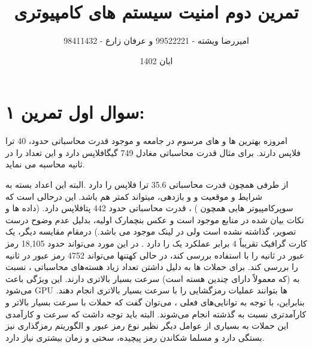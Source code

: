 \documentclass{article}
\title{تمرین دوم امنیت سیستم های کامپیوتری }
\author{
امیررضا ویشته - 99522221
 و عرفان زارع - 98411432  }
\date{ابان 1402}
\begin{document}
\maketitle

 \newpage
\section*{سوال اول تمرین ۱:}

امروزه بهترین   ها و  های مرسوم در جامعه  و موجود قدرت محاسباتی حدود، 40 ترا فلاپس دارند.
برای مثال   قدرت محاسباتی مغادل 749  گیگافلاپس دارد و این تعداد را در ثانیه محاسبه می نماید.

از طرفی   همچون    قدرت محاسباتی 35.6 ترا فلاپس را دارد .البته این اعداد بسته به شرایط و موقعیت و و بازدهی، میتواند کمتر هم باشد.
این درحالی است که سوپرکامپیوتر هایی همچون ) ، قدرت محاسباتی حدود 442 پتافلاپس دارد.
(داده ها و نکات بیان شده در منابع موجود است و عکس بنچمارک  اولیه، بدلیل عدم وضوح درست  تصویر، گذاشته نشده است ولی در لینک موجود می باشد.)
درمقام مقایسه دیگر، یک کارت گرافیک  تقریباً 4 برابر عملکرد یک    را دارد . در این مورد   می‌تواند حدود 18,105 رمز عبور در ثانیه را با استفاده  بررسی کند، در حالی کهتنها می‌تواند 4752 رمز عبور در ثانیه را بررسی کند.
برای حملات  ها به دلیل داشتن تعداد زیاد هسته‌های محاسباتی ، نسبت به  (که معمولاً دارای چندین هسته است) سرعت بسیار بالاتری دارند.  این ویژگی باعث می‌شود GPU ها بتوانند عملیات رمزگشایی را با سرعت بسیار بالاتری انجام دهند. بنابراین، با توجه به توانایی‌های فعلی ، می‌توان گفت که حملات  با سرعت بسیار بالاتر و کارآمدتری نسبت به گذشته انجام می‌شوند. البته باید توجه داشت که سرعت و کارآمدی این حملات به بسیاری از عوامل دیگر نظیر نوع رمز عبور و الگوریتم رمزگذاری نیز بستگی دارد و مسلما شکاندن رمز پیچیده، سختی و زمان بیشتری نیاز دارد.
\end{document}
